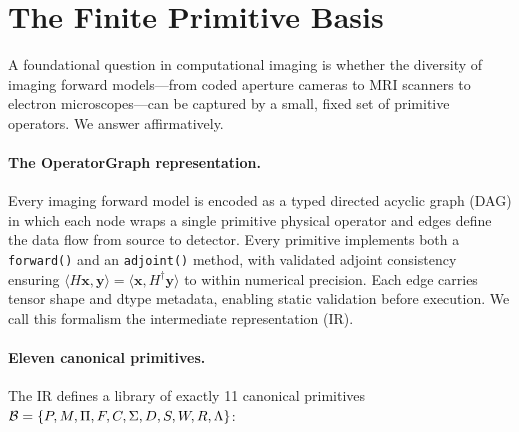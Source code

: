 \FloatBarrier
\section*{The Finite Primitive Basis}

A foundational question in computational imaging is whether the diversity of imaging forward models---from coded aperture cameras to MRI scanners to electron microscopes---can be captured by a small, fixed set of primitive operators. We answer affirmatively.

\paragraph{The OperatorGraph representation.}
Every imaging forward model is encoded as a typed directed acyclic graph (DAG) in which each node wraps a single primitive physical operator and edges define the data flow from source to detector. Every primitive implements both a \texttt{forward()} and an \texttt{adjoint()} method, with validated adjoint consistency ensuring $\langle H\mathbf{x}, \mathbf{y} \rangle = \langle \mathbf{x}, H^{\dagger}\mathbf{y} \rangle$ to within numerical precision. Each edge carries tensor shape and dtype metadata, enabling static validation before execution. We call this formalism the \opg{} intermediate representation (IR).

\paragraph{Eleven canonical primitives.}
The \opg{} IR defines a library of exactly 11 canonical primitives $\mathcal{B} = \{P, M, \Pi, F, C, \Sigma, D, S, W, R, \Lambda\}$:

